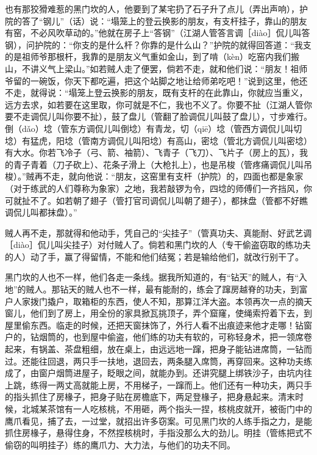 \documentclass[12pt,UTF8]{ctexbook}
\begin{document}
也有那狡猾难惹的黑门坎的人，他要到了某宅扔了石子升了点儿（弄出声响），护院的答了“钢儿”（话）说：“塌笼上的登云换影的朋友，有支杆挂子，靠山的朋友有窑，不必风吹草动的。”他就在房子上“答钢”（江湖人管答言调［diào］侃儿叫答钢），问护院的：“你支的是什么杆？你靠的是什么山？”护院的就得回答道：“我支的是祖师爷那根杆，我靠的是朋友义气重如金山，到了啃（kèn）吃窑内我们搬山，不讲义气上梁山。”如若贼人走了便罢，倘若不走，就和他们说：“朋友！祖师爷留的一碗饭，你天下都吃遍，把这个站脚之地让给师弟吃吧！”说到这里，他还不走，就得说：“塌笼上登云换影的朋友，既有支杆的在此靠山，你就应当重义，远方去求，如若要在这里取，你可就是不仁，我也不义了。你要不扯（江湖人管你要不走调侃儿叫你要不扯），鼓了盘儿（管翻了脸调侃儿叫鼓了盘儿），寸步难行。倒（dǎo）埝（管东方调侃儿叫倒埝）有青龙，切（qiē）埝（管西方调侃儿叫切埝）有猛虎，阳埝（管南方调侃儿叫阳埝）有高山，密埝（管北方调侃儿叫密埝）有大水。你若飞冷子（弓、箭、袖箭）、飞青子（飞刀）、飞片子（房上的瓦），我的青子青着（刀子砍上）、花条子滑上（大枪扎上），也是吊梭（管疼痛调侃儿叫吊梭）。”贼再不走，就向他说：“朋友，这窑里有支杆（护院）的，四面也都是象家（对于练武的人们尊称为象家）之地，我若敲锣为令，四埝的师傅们一齐挡风，你可就扯不了。如若朝了翅子（管打官司调侃儿叫朝了翅子），都抹盘（管都不好瞧调侃儿叫都抹盘）。”

贼人再不走，那就得和他动手，凭自己的“尖挂子”（管真功夫、真能耐、好武艺调［diào］侃儿叫尖挂子）对付贼人了。倘若和黑门坎的人（专干偷盗窃取的练功夫的人）动了手，赢了得留情，不能和他们结冤；若是输给他们，就改行别干了。

黑门坎的人也不一样，他们各走一条线。据我所知道的，有“钻天”的贼人，有“入地”的贼人。那钻天的贼人也不一样，最有能耐的，练会了蹿房越脊的功夫，到富户人家拨门撬户，取箱柜的东西，使人不知，那算江洋大盗。本领再次一点的摘天窗儿，他们到了房上，用全份的家具掀瓦挑顶子，弄个窟窿，使绳索捋着下去，到屋里偷东西。临走的时候，还把天窗抹饰了，外行人看不出痕迹来他才走哪！钻窗户的，钻烟筒的，也到屋中偷盗，他们练的功夫有软的，可称轻身术，把一领席卷起来，有锅盖、茶盘粗细，放在桌上，由远远地一蹿，把身子能钻进席筒，一钻而过。还能往回退，两只手一扶地，退回去，两条腿入席筒，再穿回来。这种功夫练成了，由窗户烟筒进屋子，眨眼之间，就能办到。还讲究腿上绑铁沙子，由坑内往上跳，练得一两丈高就能上房，不用梯子，一蹿而上。他们还有一种功夫，两只手的指头抓住了房椽子，把身子贴在房檐底下，两足登椽子，把身悬起来。清末时候，北城某茶馆有一人吃核桃，不用砸，两个指头一捏，核桃皮就开，被衙门中的鹰爪看见，捕了去，一过堂，就招出许多窃案。可见黑门坎的人练手指之力，是能抓住房椽子，悬得住身，不然捏核桃时，手指没那么大的劲儿。明挂（管练把式不偷窃的叫明挂子）练的鹰爪力、大力法，与他们的功夫不同。
\end{document}
